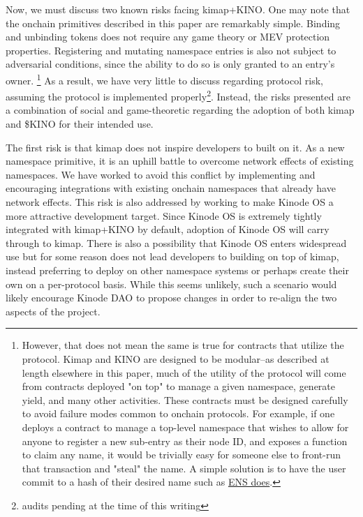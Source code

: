 \documentclass[runningheads]{llncs}
\begin{document}
Now, we must discuss two known risks facing kimap+KINO.
One may note that the onchain primitives described in this paper are remarkably simple.
Binding and unbinding tokens does not require any game theory or MEV protection properties.
Registering and mutating namespace entries is also not subject to adversarial conditions, since the ability to do so is only granted to an entry's owner.
\footnote{However, that does not mean the same is true for contracts that utilize the protocol.
Kimap and KINO are designed to be modular–as described at length elsewhere in this paper, much of the utility of the protocol will come from contracts deployed "on top" to manage a given namespace, generate yield, and many other activities.
These contracts must be designed carefully to avoid failure modes common to onchain protocols.
For example, if one deploys a contract to manage a top-level namespace that wishes to allow for anyone to register a new sub-entry as their node ID, and exposes a function to claim any name, it would be trivially easy for someone else to front-run that transaction and "steal" the name.
A simple solution is to have the user commit to a hash of their desired name such as \href{https://docs.ens.domains/registry/eth\#commit-reveal}{ENS does}.}
As a result, we have very little to discuss regarding protocol risk, assuming the protocol is implemented properly\footnote{audits pending at the time of this writing}.
Instead, the risks presented are a combination of social and game-theoretic regarding the adoption of both kimap and \$KINO for their intended use.

The first risk is that kimap does not inspire developers to built on it.
As a new namespace primitive, it is an uphill battle to overcome network effects of existing namespaces.
We have worked to avoid this conflict by implementing and encouraging integrations with existing onchain namespaces that already have network effects.
This risk is also addressed by working to make Kinode OS a more attractive development target.
Since Kinode OS is extremely tightly integrated with kimap+KINO by default, adoption of Kinode OS will carry through to kimap.
There is also a possibility that Kinode OS enters widespread use but for some reason does not lead developers to building on top of kimap, instead preferring to deploy on other namespace systems or perhaps create their own on a per-protocol basis.
While this seems unlikely, such a scenario would likely encourage Kinode DAO to propose changes in order to re-align the two aspects of the project.
\end{document}
